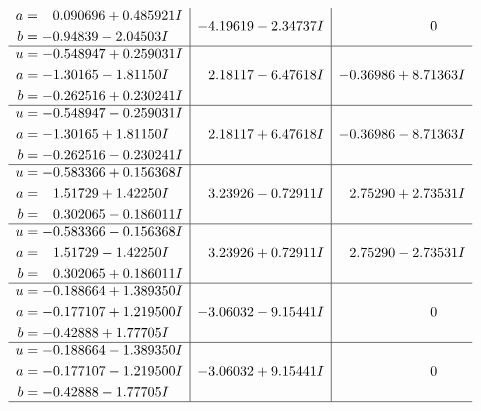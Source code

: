 \documentclass[1p]{elsarticle_modified}
\theoremstyle{definition}
\begin{document}
$$\begin{array}{c|c|c}
\begin{aligned}
a &= \phantom{-}0.090696 + 0.485921 I \\
b &= -0.94839 - 2.04503 I\end{aligned}
 & -4.19619 - 2.34737 I & \phantom{-0.000000 } 0 \\ \hline\begin{aligned}
u &= -0.548947 + 0.259031 I \\
a &= -1.30165 - 1.81150 I \\
b &= -0.262516 + 0.230241 I\end{aligned}
 & \phantom{-}2.18117 - 6.47618 I & -0.36986 + 8.71363 I \\ \hline\begin{aligned}
u &= -0.548947 - 0.259031 I \\
a &= -1.30165 + 1.81150 I \\
b &= -0.262516 - 0.230241 I\end{aligned}
 & \phantom{-}2.18117 + 6.47618 I & -0.36986 - 8.71363 I \\ \hline\begin{aligned}
u &= -0.583366 + 0.156368 I \\
a &= \phantom{-}1.51729 + 1.42250 I \\
b &= \phantom{-}0.302065 - 0.186011 I\end{aligned}
 & \phantom{-}3.23926 - 0.72911 I & \phantom{-}2.75290 + 2.73531 I \\ \hline\begin{aligned}
u &= -0.583366 - 0.156368 I \\
a &= \phantom{-}1.51729 - 1.42250 I \\
b &= \phantom{-}0.302065 + 0.186011 I\end{aligned}
 & \phantom{-}3.23926 + 0.72911 I & \phantom{-}2.75290 - 2.73531 I \\ \hline\begin{aligned}
u &= -0.188664 + 1.389350 I \\
a &= -0.177107 + 1.219500 I \\
b &= -0.42888 + 1.77705 I\end{aligned}
 & -3.06032 - 9.15441 I & \phantom{-0.000000 } 0 \\ \hline\begin{aligned}
u &= -0.188664 - 1.389350 I \\
a &= -0.177107 - 1.219500 I \\
b &= -0.42888 - 1.77705 I\end{aligned}
 & -3.06032 + 9.15441 I & \phantom{-0.000000 } 0\\
 \hline 

\end{array}$$
\end{document}
